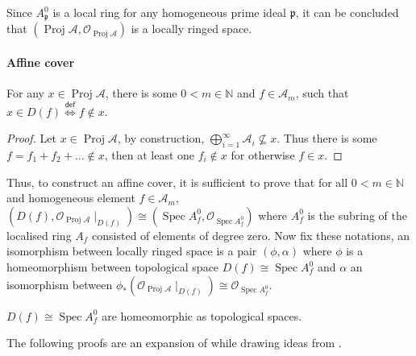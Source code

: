 \documentclass[a4paper,UKenglish,cleveref, autoref, thm-restate]{lipics-v2021}
\begin{document}
Since $A^0_{\mathfrak{p}}$ is a local ring for any homogeneous prime ideal $\mathfrak{p}$, it can be concluded that $(\operatorname{Proj}\mathcal{A},\mathcal{O}_{\operatorname{Proj}\mathcal{A}})$ is a locally ringed space.

\paragraph*{Affine cover}

\begin{lemma}\label{lemma:choose_basic_open}
    For any $x\in \operatorname{Proj}\mathcal{A}$, there is some $0 < m \in \mathbb{N}$ and $f\in \mathcal{A}_m$, such that $x\in D(f)\stackrel{\mathsf{def}}{\iff}f\not\in x$.
\end{lemma}
\begin{proof}
    Let $x\in \operatorname{Proj}\mathcal A$, by construction, $\bigoplus_{i=1}^\infty\mathcal{A}_i\not\subseteq x$. Thus there is some $f=f_1+f_2+\dots\not\in x$, then at least one $f_i\not\in x$ for otherwise $f\in x$.
\end{proof}

Thus, to construct an affine cover, it is sufficient to prove that for all $0<m\in \mathbb{N}$ and homogeneous element $f\in\mathcal{A}_m$, $(D(f),\mathcal{O}_{\operatorname{Proj}\mathcal{A}}\!\mid_{D(f)})\cong (\operatorname{Spec} A^0_f, \mathcal{O}_{\operatorname{Spec} A^0_f})$ where $A^0_f$ is the subring of the localised ring $A_f$ consisted of elements of degree zero. Now fix these notations, an isomorphism between locally ringed space is a pair $(\phi, \alpha)$ where $\phi$ is a homeomorphism between topological space $D(f)\cong\operatorname{Spec}A^0_f $ and $\alpha$ an isomorphism between
$\phi_*(\mathcal{O}_{\operatorname{Proj}\mathcal{A}}\!\mid_{D(f)})\cong \mathcal{O}_{\operatorname{Spec}A^0_f}$.

\begin{theorem}\label{thm:homeomorph}
    $D(f)\cong \operatorname{Spec}A^0_f$ are homeomorphic as topological spaces.
\end{theorem}
The following proofs are an expansion of \cite[II.2.5]{hartshorne1977graduate} while drawing ideas from \cite[II.4.5]{vakil24rising}.
\end{document}
